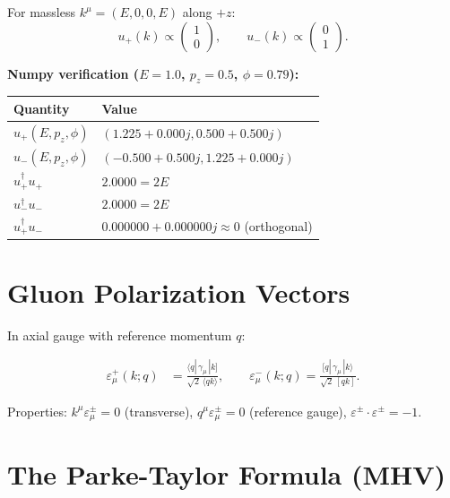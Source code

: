 For massless $k^\mu=(E,0,0,E)$ along $+z$:
\begin{equation}
u_+(k)\propto\begin{pmatrix}1\\0\end{pmatrix},
\qquad
u_-(k)\propto\begin{pmatrix}0\\1\end{pmatrix} .
\end{equation}

\textbf{Numpy verification ($E=1.0$, $p_z=0.5$, $\phi=0.79$):}
\begin{center}
\begin{tabular}{|l|l|}
\hline
Quantity & Value \\
\hline
$u_+(E,p_z,\phi)$ & $(1.225+0.000j, 0.500+0.500j)$ \\
$u_-(E,p_z,\phi)$ & $(-0.500+0.500j, 1.225+0.000j)$ \\
$u_+^\dagger u_+$ & $2.0000 = 2E$ \\
$u_-^\dagger u_-$ & $2.0000 = 2E$ \\
$u_+^\dagger u_-$ & $0.000000+0.000000j \approx 0$ (orthogonal) \\
\hline
\end{tabular}
\end{center}

\section{Gluon Polarization Vectors}\label{sec:polarization}

In axial gauge with reference momentum $q$:

\begin{mdframed}
\begin{align}
\varepsilon^+_\mu(k;q)
&= \frac{\langle q|\,\gamma_\mu\,|k]}{\sqrt2\,\langle qk\rangle},
\qquad
\varepsilon^-_\mu(k;q)
= \frac{[q|\,\gamma_\mu\,|k\rangle}{\sqrt2\,[qk]} .
\tag{50.$\star$}
\end{align}
\end{mdframed}

Properties: $k^\mu\varepsilon_\mu^\pm=0$ (transverse),
$q^\mu\varepsilon_\mu^\pm=0$ (reference gauge),
$\varepsilon^\pm\cdot\varepsilon^\pm=-1$.

\section{The Parke-Taylor Formula (MHV)}\label{sec:mhv}

